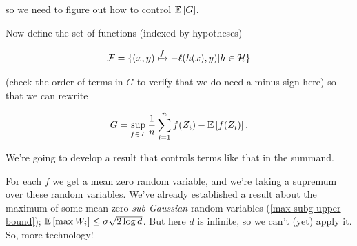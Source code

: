 \documentclass[11pt]{scrartcl}
\begin{document}
so we need to figure out how to control $\mathbb{E} \left[ G \right]$.

Now define the set of functions (indexed by hypotheses)

\begin{equation}
    \mathcal{F} = \{ (x,y) \xmapsto{f} - \ell(h(x), y) | h \in \mathcal{H} \}
    \label{F for losses}
\end{equation}

(check the order of terms in $G$ to verify that we do need a minus sign here) so that we can rewrite

\begin{equation}
    G = \sup_{f \in \mathcal{F}} \frac1n \sum_{i=1}^n f(Z_i) - \mathbb{E} \left[ f(Z_i) \right].
\end{equation}

We're going to develop a result that controls terms like that in the summand.

For each $f$ we get a mean zero random variable, and we're taking a supremum over these random variables. We've already established a result about the maximum of some mean zero \textit{sub-Gaussian} random variables (\ref{max subg upper bound}); $\mathbb{E} \left[ \max W_i \right] \le \sigma \sqrt{2 \log d}$. But here $d$ is infinite, so we can't (yet) apply it. So, more technology!



\end{document}
